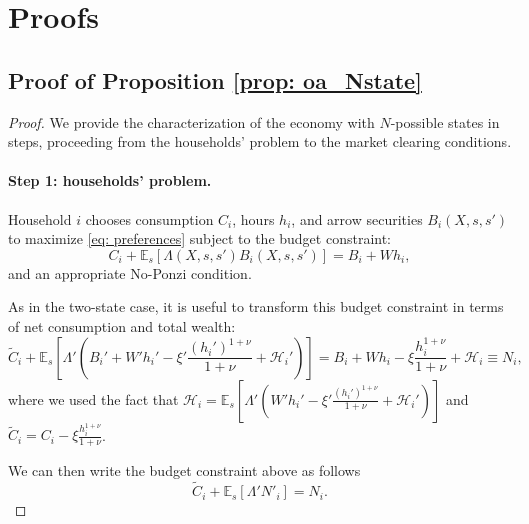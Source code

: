 \section{Proofs}

\subsection{Proof of Proposition \ref{prop: oa_Nstate}}\label{proof: oa_Nstate}
\begin{proof}
We provide the characterization of the economy with $N$-possible states in steps, proceeding from the households' problem to the market clearing conditions. 

\paragraph{Step 1: households' problem.} 
Household $i$ chooses consumption $C_{i}$, hours $h_{i}$, and arrow securities  $B_{i}(X,s,s')$ to maximize \eqref{eq: preferences} subject to the budget constraint:
\begin{equation}
    C_{i} + \mathbb{E}_s[ \Lambda(X,s,s') B_{i}(X,s,s')] = B_{i} + W h_{i},
\end{equation}
and an appropriate No-Ponzi condition. 

As in the two-state case, it is useful to transform this budget constraint in terms of net consumption and total wealth:
 \begin{equation}
    \tilde{C}_{i} + \mathbb{E}_s\left[ \Lambda' \left(  B_i' + W' h_i' - \xi' \frac{(h_i')^{1+\nu}}{1+\nu} + \mathcal{H}_i'\right)\right] = B_{i} + W h_i - \xi \frac{h_i^{1+\nu}}{1+\nu} + \mathcal{H}_i \equiv N_i,
\end{equation}
where we used the fact that $\mathcal{H}_i = \mathbb{E}_s\left[ \Lambda' \left( W' h_i' - \xi' \frac{(h_i')^{1+\nu}}{1+\nu} + \mathcal{H}_i'\right)\right]$ and $\tilde{C}_i = C_i - \xi \frac{h_i^{1+\nu}}{1+\nu}$.

We can then write the budget constraint above as follows
\begin{equation}
    \tilde{C}_i + \mathbb{E}_s\left[ \Lambda' N'_i \right] = N_i.
\end{equation}


\end{proof}
